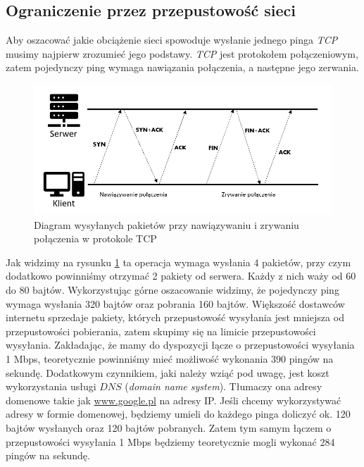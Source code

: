 \subsection{Ograniczenie przez przepustowość sieci}
Aby oszacować jakie obciążenie sieci spowoduje wysłanie jednego pinga \emph{TCP} musimy najpierw zrozumieć jego podstawy. \emph{TCP} jest protokołem połączeniowym, zatem pojedynczy ping wymaga nawiązania połączenia, a następne jego zerwania. 
\begin{figure}[!htp]
    \centering
    \includegraphics[width=13cm]{tcp_model}
    \caption{Diagram wysyłanych pakietów przy nawiązywaniu i zrywaniu połączenia w protokole TCP}
    \label{fig:tcp_model}
\end{figure}
Jak widzimy na rysunku \ref{fig:tcp_model} ta operacja wymaga wysłania 4 pakietów, przy czym dodatkowo powinniśmy otrzymać 2 pakiety od serwera. Każdy z nich waży od 60 do 80 bajtów. Wykorzystując górne oszacowanie widzimy, że pojedynczy ping wymaga wysłania 320 bajtów oraz pobrania 160 bajtów. Większość dostawców internetu sprzedaje pakiety, których przepustowość wysyłania jest mniejsza od przepustowości pobierania, zatem skupimy się na limicie przepustowości wysyłania. Zakładając, że mamy do dyspozycji łącze o przepustowości wysyłania 1 Mbps, teoretycznie powinniśmy mieć możliwość wykonania 390 pingów na sekundę. Dodatkowym czynnikiem, jaki należy wziąć pod uwagę, jest koszt wykorzystania usługi $DNS$ (\emph{domain name system}). Tłumaczy ona adresy domenowe takie jak \url{www.google.pl} na adresy IP. Jeśli chcemy wykorzystywać adresy w formie domenowej, będziemy umieli do każdego pinga doliczyć ok. 120 bajtów wysłanych oraz 120 bajtów pobranych. Zatem tym samym łączem o przepustowości wysyłania 1 Mbps będziemy teoretycznie mogli wykonać 284 pingów na sekundę.
